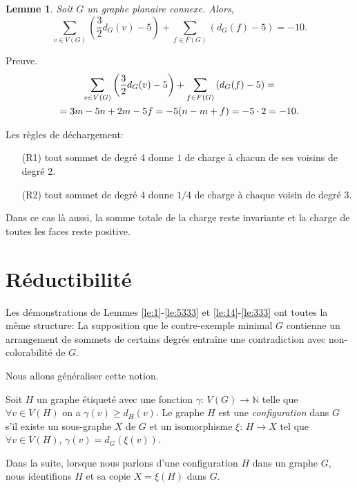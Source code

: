\documentclass{beamer}
\newtheorem{lemme}{Lemme}
\begin{document}
\begin{frame}
\begin{lemme}
Soit $G$ un graphe planaire connexe. Alors,
$$
\sum_{v \in V(G)} \left(\frac{3}{2} d_G(v) - 5\right) + \sum_{f\in F(G)} \left(d_G(f) -5\right) = -10.
$$
\label{le:cha2}
\end{lemme}
Preuve.
$$ 
\gathered
\sum_{v \in V(G)} \left(\frac{3}{2}d_G(v) - 5\right) + \sum_{f\in F(G)} \left(d_G(f) -5\right) =\\
= 3m -5n + 2m - 5f = -5(n - m + f) = -5 \cdot 2 = -10.
\endgathered
$$
\end{frame}

\begin{frame}
Les règles de déchargement:
\begin{enumerate}
\item[(R1)] tout sommet de degré 4 donne $1$ de charge à chacun de ses voisins de degré 2.
\item[(R2)] tout sommet de degré 4 donne $1/4$ de charge à chaque voisin de degré 3.
\end{enumerate}
Dans ce cas là aussi, la somme totale de la charge reste invariante et la charge de toutes les faces reste positive.
\end{frame}


\section{Réductibilité}
\begin{frame}
Les démonstrations de Lemmes \ref{le:1}-\ref{le:5333} et \ref{le:14}-\ref{le:333} ont toutes la même structure: La supposition que le contre-exemple minimal $G$ contienne un arrangement de sommets de certains degrés entraîne une contradiction avec non-colorabilité de $G$.
  

Nous allons généraliser cette notion.
\end{frame}

\begin{frame}
Soit $H$ un graphe étiqueté avec une fonction $\gamma$: $V(G) \to \mathbb{N}$ telle que $\forall v \in V(H)$ on a $\gamma(v) \geq d_H(v)$. Le graphe $H$ est une \emph{configuration} dans $G$ s'il existe un sous-graphe $X$ de $G$ et un isomorphisme $\xi$: $H \to X$ tel que $\forall v \in V(H)$, $\gamma(v) = d_G(\xi(v))$. 

\pause

Dans la suite, lorsque nous parlons d'une configuration $H$ dans un graphe $G$, nous identifions $H$ et sa copie $X=\xi(H)$ dans $G$.
\end{frame}
\end{document}
